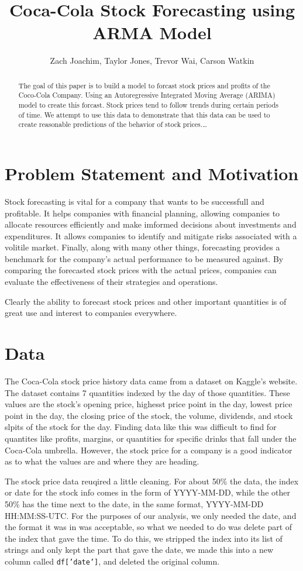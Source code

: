 \documentclass[12pt]{article}
\title{Coca-Cola Stock Forecasting using ARMA Model}
\author{Zach Joachim, Taylor Jones, Trevor Wai, Carson Watkin}
\begin{document}
\maketitle

\begin{abstract}
 The goal of this paper is to build a model to forcast stock prices and profits of the Coco-Cola Company. Using an Autoregressive Integrated Moving Average (ARIMA) model to create this forcast. Stock prices tend to follow trends during certain periods of time. We attempt to use this data to demonstrate that this data can be used to create reasonable predictions of the behavior of stock prices.\dots
 \end{abstract}

\section{Problem Statement and Motivation}

Stock forecasting is vital for a company that wants to be successfull and profitable. It helps companies 
with financial planning, allowing companies to allocate resources efficiently and make imformed decisions 
about investments and expenditures. It allows companies to identify and mitigate risks associated with a 
volitile market. Finally, along with many other things, forecasting provides a benchmark for the company's 
actual performance to be measured against. By comparing the forecasted stock prices with the actual prices, 
companies can evaluate the effectiveness of their strategies and operations.\par
Clearly the ability to forecast stock prices and other important quantities is of great use and interest to 
companies everywhere.

\section{Data}

The Coca-Cola stock price history data came from a dataset on Kaggle's website. The dataset contains 7 quantities 
indexed by the day of those quantities. These values are the stock's opening price, highesst price point in the day, 
lowest price point in the day, the closing price of the stock, the volume, dividends, and stock slpits of the 
stock for the day. Finding data like this was difficult to find for quantites like profits, margins, or quantities 
for specific drinks that fall under the Coca-Cola umbrella. However, the stock price for a company is a good indicator 
as to what the values are and where they are heading.\par
The stock price data reuqired a little cleaning. For about 50\% the data, the index or date for the stock info 
comes in the form of YYYY-MM-DD, while the other 50\% has the time next to the date, in the same format, 
YYYY-MM-DD HH:MM:SS-UTC\@. For the purposes of our analysis, we only needed the date, and the format it was in was acceptable, 
so what we needed to do was delete part of the index that gave the time. To do this, we stripped the index 
into its list of strings and only kept the part that gave the date, we made this into a new column called \texttt{df['date']}, 
and deleted the original column.
\end{document}

